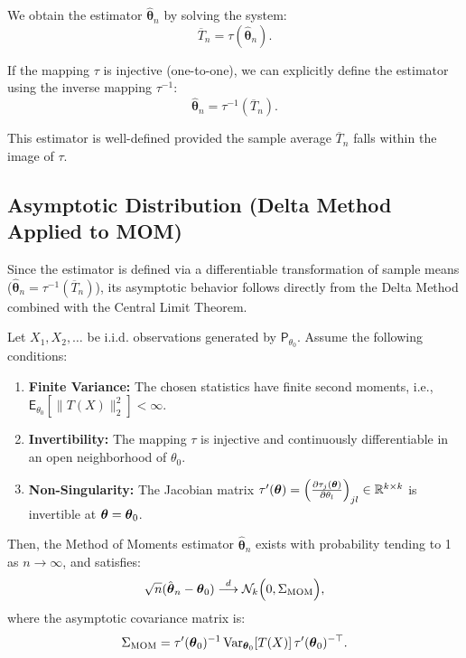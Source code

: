 We obtain the estimator $\hat{\boldsymbol{\theta}}_n$ by solving the system:
\[ \overline{T}_n = \tau(\hat{\boldsymbol{\theta}}_n). \]



If the mapping $\tau$ is injective (one-to-one), we can explicitly define the estimator using the inverse mapping $\tau^{-1}$:
\[ \hat{\boldsymbol{\theta}}_n = \tau^{-1}(\overline{T}_n). \]
\begin{remark}[]
This estimator is well-defined provided the sample average $\overline{T}_n$ falls within the image of $\tau$.
\end{remark}

\subsection*{Asymptotic Distribution (Delta Method Applied to MOM)}

Since the estimator is defined via a differentiable transformation of sample means ($\hat{\boldsymbol{\theta}}_n = \tau^{-1}(\overline{T}_n)$), its asymptotic behavior follows directly from the Delta Method combined with the Central Limit Theorem.

\begin{theo}\label{thm:mom_asymptotics}
Let $X_1, X_2, \dots$ be i.i.d. observations generated by $\mathsf{P}_{\theta_0}$. Assume the following conditions:
\begin{enumerate}[label=\roman*)]
    \item \textbf{Finite Variance:} The chosen statistics have finite second moments, i.e., $\mathsf{E}_{\theta_0}[\|T(X)\|_2^2] < \infty$.
    \item \textbf{Invertibility:} The mapping $\tau$ is injective and continuously differentiable in an open neighborhood of $\theta_0$.
    \item \textbf{Non-Singularity:} The Jacobian matrix $\tau'(\boldsymbol{\theta}) = \left( \frac{\partial \tau _{j}(\boldsymbol{\theta})}{\partial \theta_{l }}  \right)_{jl}  \in \mathbb{R}^{k \times k}$ is invertible at $\boldsymbol{\theta} = \boldsymbol{\theta}_0$.
\end{enumerate}

Then, the Method of Moments estimator $\hat{\boldsymbol{\theta}}_n$ exists with probability tending to 1 as $n \to \infty$, and satisfies:
\[ \sqrt{n}(\hat{\boldsymbol{\theta}}_n - \boldsymbol{\theta}_0) \stackrel{d}{\longrightarrow} \mathcal{N}_k \Big( 0, \Sigma_{\text{MOM}} \Big), \]
where the asymptotic covariance matrix is:
\[ \Sigma_{\text{MOM}} = \tau'(\boldsymbol{\theta}_0)^{-1} \operatorname{Var}_{\boldsymbol{\theta}_0}[T(X)] \, \tau'(\boldsymbol{\theta}_0)^{-\top}. \]
\end{theo}

